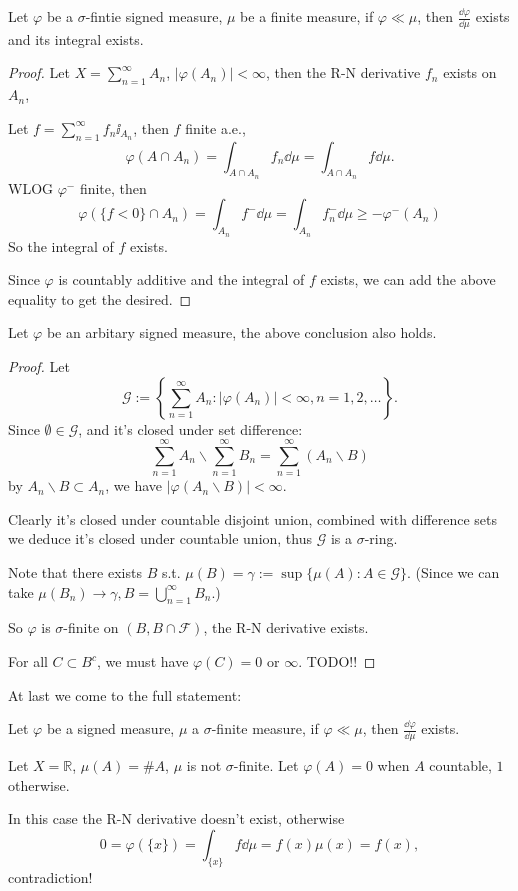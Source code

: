 \begin{proposition}
	Let $\varphi$ be a $\sigma$-fintie signed measure,  $\mu$ be a finite measure,
	if $\varphi\ll \mu$, then $\frac{\dd\varphi}{\dd\mu}$ exists and
	its integral exists.
\end{proposition}
\begin{proof}[Proof]
    Let $X = \sum_{n=1}^{\infty} A_n$, $|\varphi(A_n)| <\infty$,
	then the R-N derivative $f_n$ exists on $A_n$,

	Let $f = \sum_{n=1}^{\infty} f_n\ii_{A_n}$, then $f$ finite a.e.,
	\[
	\varphi(A\cap A_n) = \int_{A\cap A_n}f_n \dd\mu = \int_{A\cap A_n}f\dd \mu.
	\]
	WLOG $\varphi^-$ finite, then
	\[
	\varphi(\{f<0\}\cap A_n) = \int_{A_n}f^-\dd\mu = \int_{A_n}f_n^-\dd\mu
	\ge -\varphi^-(A_n)
	\]
	So the integral of $f$ exists.

	Since $\varphi$ is countably additive and the integral of $f$ exists,
	we can add the above equality to get the desired.
\end{proof}

\begin{proposition}
	Let $\varphi$ be an arbitary signed measure, the above conclusion also holds.
\end{proposition}
\begin{proof}[Proof]
    Let
	\[
	\mathscr{G}:=\left\{\sum_{n=1}^{\infty} A_n :
	|\varphi(A_n)|< \infty, n=1,2,\dots\right\}.
	\]
	Since $\emptyset\in \mathscr{G}$, and it's closed under set difference:
	\[
	\sum_{n=1}^{\infty} A_n \backslash \sum_{n=1}^{\infty} B_n
	= \sum_{n=1}^{\infty} (A_n \backslash B)
	\]
	by $A_n \backslash B \subset A_n$,
	we have $|\varphi(A_n \backslash B)| < \infty$.

	Clearly it's closed under countable disjoint union, combined with
	difference sets we deduce it's closed under countable union, thus
	$\mathscr{G}$ is a $\sigma$-ring.

	Note that there exists  $B$ s.t.
	$\mu(B) = \gamma:= \sup\{\mu(A): A\in \mathscr{G}\}$.
	(Since we can take $\mu(B_n) \to \gamma, B = \bigcup_{n=1}^\infty B_n$.)

	So $\varphi$ is $\sigma$-finite on  $(B, B\cap \mathscr{F})$,
	the R-N derivative exists.

	For all $C \subset B^c$, we must have $\varphi(C) = 0$ or $ \infty$.
	TODO!!
\end{proof}

At last we come to the full statement:
\begin{theorem}
    Let $\varphi$ be a signed measure, $\mu$ a $\sigma$-finite measure,
	if  $\varphi\ll\mu$, then $\frac{\dd \varphi}{\dd \mu}$ exists.
\end{theorem}
\begin{example}
    Let $X = \mathbb{R}$, $\mu(A) = \#A$, $\mu$ is not $\sigma$-finite.
	Let  $\varphi(A) = 0$ when $A$ countable, $1$ otherwise.

	In this case the R-N derivative doesn't exist, otherwise
	\[
	0 = \varphi(\{x\}) = \int_{\{x\}} f\dd \mu = f(x)\mu(x) = f(x),
	\]
	contradiction!
\end{example}
